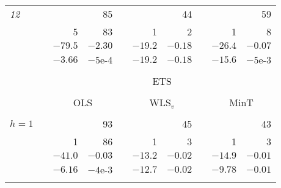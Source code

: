 \documentclass[11pt]{article}
\newcommand{\0}{\phantom{0}}
\begin{document}
\begin{table}[!htbp]
\begin{threeparttable}
\begin{tabular}{lrrrrrrrrr}
			{\it 12} &  &                           & 85      &                               &         & 44                       &  &          & 59      \\
			         &  & 5                         & 83      &                               & 1       & 2                        &  & 1        & 8       \\
			         &  & $-79.5$                   & $-2.30$ &                               & $-19.2$ & $-0.18$                  &  & $-26.4$  & $-0.07$ \\
			         &  & $-3.66$                   & $-5$e-4 &                               & $-19.2$ & $-0.18$                  &  & $-15.6$  & $-5$e-3 \\
			\cline{3-4} \cline{6-7} \cline{9-10}                                                                                                           \\[-0.3cm]
			         &  & \multicolumn{8}{c}{ETS}                                                                                                          \\
			\cline{3-10}                                                                                                                                   \\[-0.3cm]
			         &  & \multicolumn{2}{c}{OLS}   &         & \multicolumn{2}{c}{WLS$_{v}$} &         & \multicolumn{2}{c}{MinT}                         \\
			\cline{3-4} \cline{6-7} \cline{9-10}                                                                                                           \\[-0.3cm]

			$h = 1$  &  &                           & 93      &                               &         & 45                       &  &          & 43      \\
			         &  & 1                         & 86      &                               & 1       & 3                        &  & 1        & 3       \\
			         &  & $-41.0$                   & $-0.03$ &                               & $-13.2$ & $-0.02$                  &  & $-14.9$  & $-0.01$ \\
			         &  & $-6.16$                   & $-4$e-3 &                               & $-12.7$ & $-0.02$                  &  & $-9.78$  & $-0.01$ \\\\[-0.3cm]


\end{tabular}
\end{threeparttable}
\end{table}
\end{document}

